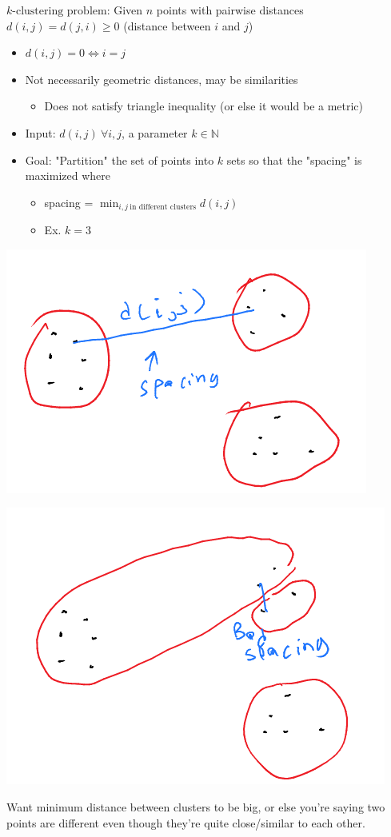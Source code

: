 \documentclass[11pt]{article}
\begin{document}
\uline{\(k\text{-clustering problem}\)}: Given \(n\) points with pairwise distances \(d(i,j)=d(j,i)\geq 0\) (distance between \(i\) and \(j\))
\begin{itemize}
\item \(d(i,j) = 0 \iff i=j\)
\item Not necessarily geometric distances, may be similarities
\begin{itemize}
\item Does not satisfy triangle inequality (or else it would be a metric)
\end{itemize}
\item Input: \(d(i,j) \ \forall i,j\), a parameter \(k \in \mathbb{N}\)
\item Goal: "Partition" the set of points into \(k\) sets so that the "spacing" is maximized where
\begin{itemize}
\item spacing = \(\min_{i,j \ \text{in different clusters}} d(i,j)\)
\item Ex. \(k=3\)
\end{itemize}
\end{itemize}
\begin{center}
\includegraphics[width=.9\linewidth]{./Images/i55.png}
\end{center}
\begin{center}
\includegraphics[width=.9\linewidth]{./Images/i56.png}
\end{center}
Want minimum distance between clusters to be big, or else you're saying two points are different even though they're quite close/similar to each other.
\end{document}
